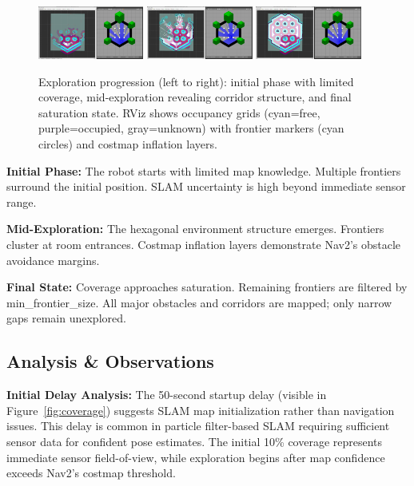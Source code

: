 \documentclass[conference]{IEEEtran}
\begin{document}
\begin{figure}[t]
\centering
\includegraphics[width=0.31\textwidth]{figures/Progress_1of6.png}\hfill
\includegraphics[width=0.31\textwidth]{figures/Progress_3of6.png}\hfill
\includegraphics[width=0.31\textwidth]{figures/Progress_6of6.png}
\caption{Exploration progression (left to right): initial phase with limited coverage, mid-exploration revealing corridor structure, and final saturation state. RViz shows occupancy grids (cyan=free, purple=occupied, gray=unknown) with frontier markers (cyan circles) and costmap inflation layers.}
\label{fig:progression}
\end{figure}

\textbf{Initial Phase:} The robot starts with limited map knowledge. Multiple frontiers surround the initial position. SLAM uncertainty is high beyond immediate sensor range.

\textbf{Mid-Exploration:} The hexagonal environment structure emerges. Frontiers cluster at room entrances. Costmap inflation layers demonstrate Nav2's obstacle avoidance margins.

\textbf{Final State:} Coverage approaches saturation. Remaining frontiers are filtered by min\_frontier\_size. All major obstacles and corridors are mapped; only narrow gaps remain unexplored.

\subsection{Analysis \& Observations}

\textbf{Initial Delay Analysis:} The 50-second startup delay (visible in Figure~\ref{fig:coverage}) suggests SLAM map initialization rather than navigation issues. This delay is common in particle filter-based SLAM requiring sufficient sensor data for confident pose estimates. The initial 10\% coverage represents immediate sensor field-of-view, while exploration begins after map confidence exceeds Nav2's costmap threshold.
\end{document}
